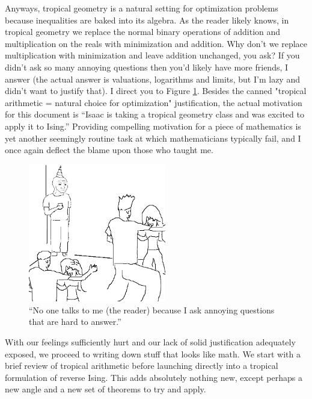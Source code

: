 Anyways, tropical geometry is a natural setting for optimization problems because inequalities are baked into its algebra. As the reader likely knows, in tropical geometry we replace the normal binary operations of addition and multiplication on the reals with minimization and addition. Why don't we replace multiplication with minimization and leave addition unchanged, you ask? If you didn't ask so many annoying questions then you'd likely have more friends, I answer (the actual answer is valuations, logarithms and limits, but I'm lazy and didn't want to justify that). I direct you to Figure \ref{fig:no-friends}. Besides the canned "tropical arithmetic = natural choice for optimization" justification, the actual motivation for this document is ``Isaac is taking a tropical geometry class and was excited to apply it to Ising.'' Providing compelling motivation for a piece of mathematics is yet another seemingly routine task at which mathematicians typically fail, and I once again deflect the blame upon those who taught me.
\begin{figure}[ht]
    \centering
	\includegraphics[width=6cm]{./figures/no-friends-at-party.png}
    \caption{``No one talks to me (the reader) because I ask annoying questions that are hard to answer.''}
	\label{fig:no-friends}
\end{figure}

With our feelings sufficiently hurt and our lack of solid justification adequately exposed, we proceed to writing down stuff that looks like math. We start with a brief review of tropical arithmetic before launching directly into a tropical formulation of reverse Ising. This adds absolutely nothing new, except perhaps a new angle and a new set of theorems to try and apply.

